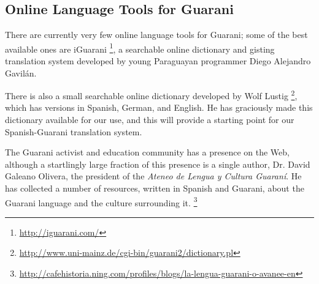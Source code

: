 \subsection{Online Language Tools for Guarani}
There are currently very few online language tools for Guarani; some of the
best available ones are iGuarani \footnote{\url{http://iguarani.com/}}, a
searchable online dictionary and gisting translation system developed by young
Paraguayan programmer Diego Alejandro Gavilán.

There is also a small searchable online dictionary developed by Wolf Lustig
\footnote{\url{http://www.uni-mainz.de/cgi-bin/guarani2/dictionary.pl}},
which has versions in Spanish, German, and English. He has graciously made this
dictionary available for our use, and this will provide a starting point for
our Spanish-Guarani translation system.

The Guarani activist and education community has a presence on the Web,
although a startlingly large fraction of this presence is a single author,
Dr. David Galeano Olivera, the president of the \emph{Ateneo de Lengua y
Cultura Guaraní}. He has collected a number of resources, written in Spanish
and Guarani, about the Guarani language and the culture surrounding it.
\footnote{\url{http://cafehistoria.ning.com/profiles/blogs/la-lengua-guarani-o-avanee-en}}
